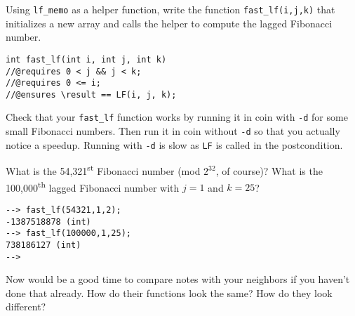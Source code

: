 \begin{part}
  Using \lstinline'lf_memo' as a helper function, write the function
  \lstinline'fast_lf(i,j,k)' that initializes a new array and calls
  the helper to compute the lagged Fibonacci number.

\begin{lstlisting}[belowskip=0pt]
int fast_lf(int i, int j, int k)
//@requires 0 < j && j < k;
//@requires 0 <= i;
//@ensures \result == LF(i, j, k);
\end{lstlisting}
\end{part}

\begin{part}
  Check that your \lstinline'fast_lf' function works by running it in
  coin with \lstinline'-d' for some small Fibonacci numbers. Then run
  it in coin without \lstinline'-d' so that you actually notice a
  speedup. Running with \lstinline'-d' is slow as \lstinline'LF' is
  called in the postcondition.
\end{part}

\begin{part}
  What is the 54,321\textsuperscript{st} Fibonacci number (mod
  $2^{32}$, of course)? What is the 100,000\textsuperscript{th} lagged
  Fibonacci number with $j = 1$ and $k = 25$?
\end{part}

\begin{solution}
\begin{lstlisting}[language={[coin]C}]
--> fast_lf(54321,1,2);
-1387518878 (int)
--> fast_lf(100000,1,25);
738186127 (int)
-->
\end{lstlisting}
\end{solution}

Now would be a good time to compare notes with your neighbors if you
haven't done that already. How do their functions look the same? How
do they look different?

\twoPT

